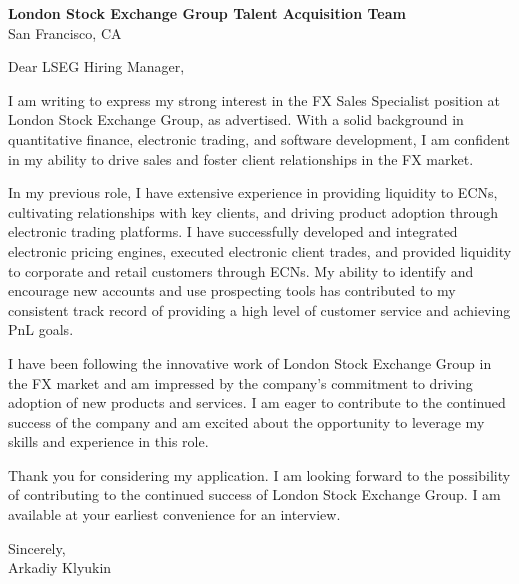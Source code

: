 \documentclass{letter}
\begin{document}
\begin{letter}{\textbf{London Stock Exchange Group Talent Acquisition Team} \\
                San Francisco, CA}


\opening{Dear LSEG Hiring Manager,}

I am writing to express my strong interest in the FX Sales Specialist position at London Stock Exchange Group, as advertised. With a solid background in quantitative finance, electronic trading, and software development, I am confident in my ability to drive sales and foster client relationships in the FX market.

In my previous role, I have extensive experience in providing liquidity to ECNs, cultivating relationships with key clients, and driving product adoption through electronic trading platforms. I have successfully developed and integrated electronic pricing engines, executed electronic client trades, and provided liquidity to corporate and retail customers through ECNs. My ability to identify and encourage new accounts and use prospecting tools has contributed to my consistent track record of providing a high level of customer service and achieving PnL goals.

I have been following the innovative work of London Stock Exchange Group in the FX market and am impressed by the company's commitment to driving adoption of new products and services. I am eager to contribute to the continued success of the company and am excited about the opportunity to leverage my skills and experience in this role.

Thank you for considering my application. I am looking forward to the possibility of contributing to the continued success of London Stock Exchange Group. I am available at your earliest convenience for an interview.

Sincerely,\\
Arkadiy Klyukin
\end{letter}
\end{document}
